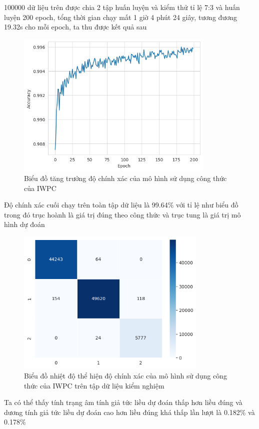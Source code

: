 \documentclass[14pt,oneside]{scrbook}
\begin{document}
100000 dữ liệu trên được chia 2 tập huấn luyện và kiểm thử tỉ lệ 7:3 và
huấn luyện 200 epoch, tổng thời gian chạy mất 1 giờ 4 phút 24 giây,
tương đương 19.32s cho mỗi epoch, ta thu được kết quả sau

\begin{figure}
\centering
\includegraphics[width=\textwidth,height=7cm]{image/iwpc_accu.png}
\caption{Biểu đồ tăng trưởng độ chính xác của mô hình sử dụng công thức
của IWPC}
\end{figure}

Độ chính xác cuối chạy trên toàn tập dữ liệu là 99.64\% với tỉ lệ như
biểu đồ trong đó trục hoành là giá trị đúng theo công thức và trục tung
là giá trị mô hình dự đoán

\begin{figure}
\centering
\includegraphics[width=\textwidth,height=7cm]{image/iwpc_heatmap.png}
\caption{Biểu đồ nhiệt độ thể hiện độ chính xác của mô hình sử dụng công
thức của IWPC trên tập dữ liệu kiểm nghiệm}
\end{figure}

Ta có thể thấy tính trạng âm tính giả tức liều dự đoán thấp hơn liều
đúng và dương tính giả tức liều dự đoán cao hơn liều đúng khá thấp lần
lượt là 0.182\% và 0.178\%
\end{document}
